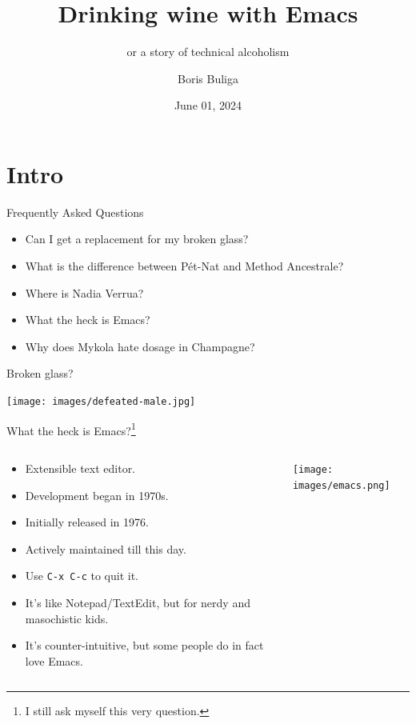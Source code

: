 \documentclass[presentation,aspectratio=169,smaller]{beamer}
\author{Boris Buliga}
\date{June 01, 2024}
\title{Drinking wine with Emacs}
\subtitle{or a story of technical alcoholism}
\begin{document}
\maketitle
\newcommand{\mathcolorbox}[2]{%
  \begingroup
  \setlength{\fboxsep}{2pt}%
  \colorbox{#1}{$\displaystyle #2$}%
  \endgroup
}

\section*{Intro}
\label{sec:orgd50c1a8}
\begin{frame}[label={sec:orgd6c33a0}]{Frequently Asked Questions}
\begin{itemize}
\item Can I get a replacement for my broken glass?
\item What is the difference between Pét-Nat and Method Ancestrale?
\item Where is Nadia Verrua?
\item What the heck is Emacs?
\item Why does Mykola hate dosage in Champagne?
\end{itemize}
\end{frame}
\begin{frame}[label={sec:org10c9c75}]{Broken glass?}
\begin{center}
\texttt{[image: images/defeated-male.jpg]}
\end{center}
\end{frame}
\begin{frame}[label={sec:orgdf6f171},fragile]{What the heck is Emacs?\footnote{I still ask myself this very question.}}
 \begin{columns}
\begin{column}{0.5\columnwidth}
\begin{itemize}
\item \alert{Extensible} text editor.
\item Development began in 1970s.
\item Initially released in 1976.
\item Actively maintained till this day.
\item Use \texttt{C-x C-c} to quit it.
\item It's like Notepad/TextEdit, but for nerdy and masochistic kids.
\item It's counter-intuitive, but some people do in fact love Emacs.
\end{itemize}
\end{column}
\begin{column}{0.5\columnwidth}
\begin{center}
\texttt{[image: images/emacs.png]}
\end{center}
\end{column}
\end{columns}
\end{frame}
\end{document}
